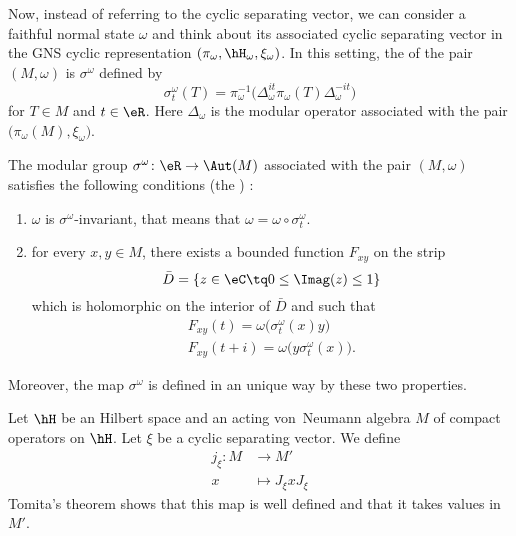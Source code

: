 Now, instead of referring to the cyclic separating vector, we can consider a faithful normal state $\omega$ and think about its associated cyclic separating vector in the GNS cyclic representation $(\pi_{\omega},\hH_{\omega},\xi_{\omega})$. In this setting, the  of the pair $(M,\omega)$ is $\sigma^{\omega}$ defined by
\begin{equation}
	\sigma_t^{\omega}(T)=\pi_{\omega}^{-1}\big( \Delta_{\omega}^{it}\pi_{\omega}(T)\Delta_{\omega}^{-it} \big)
\end{equation}
for $T\in M$ and $t\in\eR$. Here $\Delta_{\omega}$ is the modular operator associated with the pair $\big( \pi_{\omega}(M),\xi_{\omega} \big)$.

\begin{theorem}
	The modular group $\sigma^{\omega}\colon \eR\to \Aut(M)$ associated with the pair $(M,\omega)$ satisfies the following conditions (the ) :
	\begin{enumerate}
		\item
			$\omega$ is $\sigma^{\omega}$-invariant, that means that $\omega=\omega\circ\sigma_t^{\omega}$.
		\item
			for every $x,y\in M$, there exists a bounded function $F_{xy}$ on the strip
			\begin{equation}
				\bar D=\{ z\in\eC\tq 0\leq\Imag(z)\leq 1 \}
			\end{equation}
			which is holomorphic on the interior of $\bar D$ and such that
			\begin{subequations}
				\begin{align}
					F_{xy}(t)=\omega\big( \sigma^{\omega}_t(x)y \big)\\
					F_{xy}(t+i)=\omega\big(y \sigma^{\omega}_t(x) \big).
				\end{align}
			\end{subequations}
			
	\end{enumerate}
	Moreover, the map $\sigma^{\omega}$ is defined in an unique way by these two properties.
\end{theorem}

Let $\hH$ be an Hilbert space and an acting von~Neumann algebra $M$ of compact operators on $\hH$. Let $\xi$ be a cyclic separating vector. We define
\begin{equation}
	\begin{aligned}
		j_{\xi}\colon M&\to M' \\
		x&\mapsto J_{\xi}xJ_{\xi} 
	\end{aligned}
\end{equation}
Tomita's theorem shows that this map is well defined and that it takes values in $M'$.

